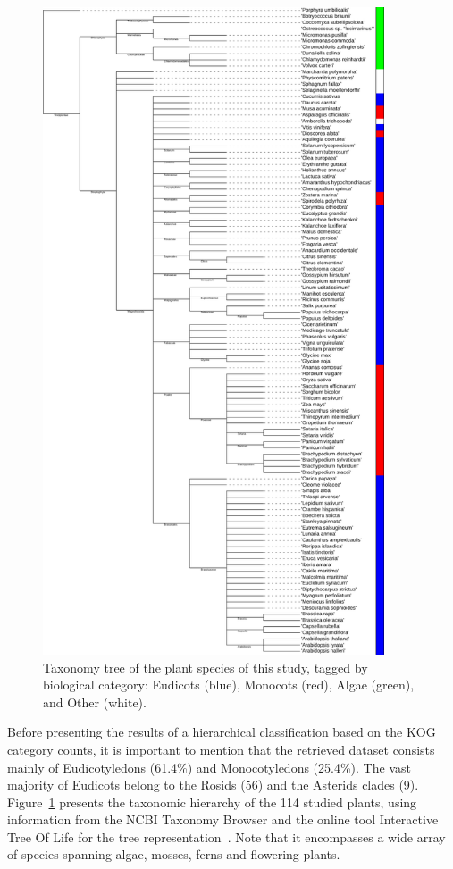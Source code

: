 \begin{figure}[htp]
\centering
\includegraphics[width=0.9\textwidth]{figures/Taxa}
\caption{Taxonomy tree of the plant species of this study, 
tagged by biological category: Eudicots (blue), Monocots 
(red), Algae (green), and Other (white).
}
\label{fig:taxa}
\end{figure}

Before presenting the results of a hierarchical 
classification based on the KOG category counts, it is 
important to mention that the retrieved dataset consists 
mainly of Eudicotyledons (61.4\%) and Monocotyledons (25.4\%). 
The vast majority of Eudicots belong to the Rosids (56) 
and the Asterids clades (9). Figure~\ref{fig:taxa} presents 
the taxonomic hierarchy of 
the 114 studied plants, using information from the NCBI Taxonomy 
Browser and the online tool Interactive Tree Of Life for 
the tree representation~\citep{letunic2021}. Note that it 
encompasses a wide array of species spanning algae, 
mosses, ferns and flowering plants.

